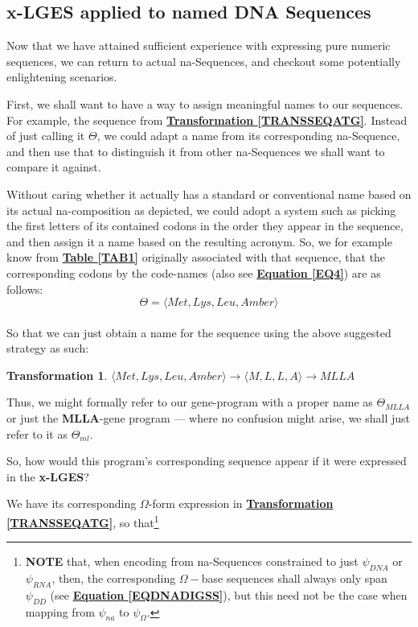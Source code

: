 \documentclass[a4paper, 18pt]{book} %
\newtheorem{trans}{Transformation}
\begin{document}
\subsection{x-LGES applied to named DNA Sequences}

Now that we have attained sufficient experience with expressing pure numeric sequences, we can return to actual na-Sequences, and checkout some potentially enlightening scenarios.

First, we shall want to have a way to assign meaningful names to our sequences. For example, the sequence from \textbf{\hyperref[TRANSSEQATG]{Transformation \ref{TRANSSEQATG}}}. Instead of just calling it $\Theta$, we could adapt a name from its corresponding na-Sequence, and then use that to distinguish it from other na-Sequences we shall want to compare it against.

Without caring whether it actually has a standard or conventional name based on its actual na-composition as depicted, we could adopt a system such as picking the first letters of its contained codons in the order they appear in the sequence, and then assign it a name based on the resulting acronym. So, we for example know from \textbf{\hyperref[TAB1]{Table \ref{TAB1}}} originally associated with that sequence, that the corresponding codons  by the code-names (also see \textbf{\hyperref[EQ4]{Equation \ref{EQ4}}}) are as follows:\\

\begin{equation}
\Theta = \langle Met, Lys, Leu, Amber \rangle
\end{equation}\\

So that we can just obtain a name for the sequence using the above suggested strategy as such:

\begin{trans}
$\langle Met, Lys, Leu, Amber \rangle \rightarrow \langle M, L, L, A \rangle \rightarrow MLLA$
\end{trans}

Thus, we might formally refer to our gene-program with a proper name as $\Theta_{MLLA}$ or just the \textbf{MLLA}-gene program --- where no confusion might arise, we shall just refer to it as $\Theta_{ml}$. 

So, how would this program's corresponding sequence appear if it were expressed in the \textbf{x-LGES}?

We have its corresponding $\Omega$-form expression in \textbf{\hyperref[TRANSSEQATG]{Transformation \ref{TRANSSEQATG}}}, so that\footnote{\textbf{NOTE} that, when encoding from na-Sequences constrained to just $\psi_{DNA}$ or $\psi_{RNA}$, then, the corresponding $\Omega-$base sequences shall always only span $\psi_{DD}$ (see \textbf{\hyperref[EQDNADIGSS]{Equation \ref{EQDNADIGSS}}}), but this need not be the case when mapping from $\psi_{na}$ to $\psi_{\Omega}$.}\\
\end{document}
